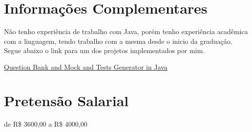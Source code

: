 \documentclass[a4paper,12pt]{article}
\begin{document}
\section{Informações Complementares}

Não tenho experiência de trabalho com Java, porém tenho experiência acadêmica com a linguagem, tendo trabalho com a mesma desde o inicio da graduação. Segue abaixo o link para um dos projetos implementados por mim.

\href{https://github.com/MateusRosario/QuestionsBank}{Question Bank and Mock and Tests Generator in Java}

\section{Pretensão Salarial}
de R\$ 3600,00 a R\$ 4000,00



\end{document}
